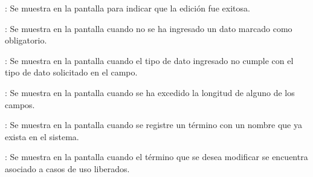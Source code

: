 \begin{Citemize}
	\item {}: Se muestra en la pantalla  para indicar que la edición fue exitosa.
	\item {}: Se muestra en la pantalla  cuando no se ha ingresado un dato marcado como obligatorio.
	\item {}: Se muestra en la pantalla  cuando el tipo de dato ingresado no cumple con el tipo de dato solicitado en el campo.
	\item {}: Se muestra en la pantalla  cuando se ha excedido la longitud de alguno de los campos.
	\item {}: Se muestra en la pantalla  cuando se registre un término con un nombre que ya exista en el sistema.
	\item {}: Se muestra en la pantalla  cuando el término que se desea modificar se encuentra asociado a casos de uso liberados.
\end{Citemize}
